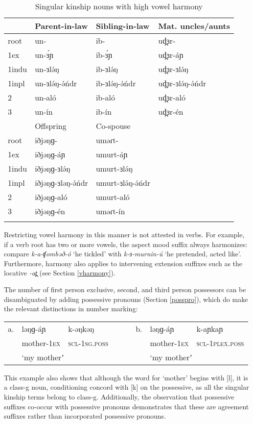 \begin{table} 
\caption{Singular kinship nouns with high vowel harmony} \label{kintable}
\begin{tabular}[t]{llll}
\lsptoprule
		& Parent-in-law	&	Sibling-in-law	&	Mat. uncles/aunts	\\
	\midrule
root	& un-	&ib-	&ud̪ɜr-	\\
1ex 		& un-ɜ́ɲ	&ib-ɜ́ɲ	&ud̪ɜr-áɲ		 \\
1indu	& un-ɜlə́ŋ &	ib-ɜlə́ŋ &	ud̪ɜr-ɜlə́ŋ	\\
1inpl	& un-ɜlə́ŋ-ə́ńdr	& ib-ɜlə́ŋ-ə́ńdr & ud̪ɜr-ɜlə́ŋ-ə́ńdr	\\
2		& un-aló	& ib-aló	& ud̪ɜr-aló	\\
3		& un-ín		& ib-ín		& ud̪ɜr-én	\\
	\midrule
	&	Offspring	&	Co-spouse & \\
	\midrule
root	&	iðjəŋɡ-			&	uməɾt-			& \\	 
1ex		&	iðjəŋɡ-áɲ		&	umurt-áɲ		& \\
1indu	& iðjəŋɡ-ɜlə́ŋ		&	umurt-ɜlə́ŋ	 	& \\
1inpl	& iðjəŋɡ-ɜləŋ-ə́ńdr	&	umurt-ɜlə́ŋ-ə́ńdr	& \\
2		&	iðjəŋɡ-aló		&	umurt-aló	 	& \\
3		&	iðjəŋɡ-én		&	uməɾt-ín		& \\
	\lspbottomrule
\end{tabular}	
\end{table}
	
Restricting vowel harmony in this manner is not attested in verbs. For example, if a verb root has two or more vowels, the aspect mood suffix always harmonizes: compare \textit{k-a-ʧombəð-ó} `he tickled’ with \textit{k-ɜ-murnin-ú} `he pretended, acted like’. Furthermore, harmony also applies to intervening extension suffixes such as the locative \textit{-at̪} (see Section \ref{vharmony}). %

The number of first person exclusive, second, and third person possessors can be disambiguated by adding possessive pronouns (Section \ref{posspro}), which do make the relevant distinctions in number marking:

\ea 
\hspace{-12pt} \vspace{-12pt} \begin{tabular}[t]{lllllll}
 a. &  ləŋɡ-áɲ & k-əŋkəŋ	& {\ \ \ } & b.	&	ləŋɡ-áɲ &  k-aɲkaɲ\\
 & mother-\textsc{1ex} & \textsc{scl-1sg.poss}  & & &	mother-\textsc{1ex} & \textsc{scl-1plex.poss} \\
& \multicolumn{2}{l}{‘my motherʼ} & &  & \multicolumn{2}{l}{‘my motherʼ}	\\	
\end{tabular}
\z
This example also shows that although the word for `mother’ begins with [l], it is a class-g noun, conditioning concord with [k] on the possessive, as all the singular kinship terms belong to class-g. Additionally, the observation that possessive suffixes co-occur with possessive pronouns demonstrates that these are agreement suffixes rather than incorporated possessive pronouns.

